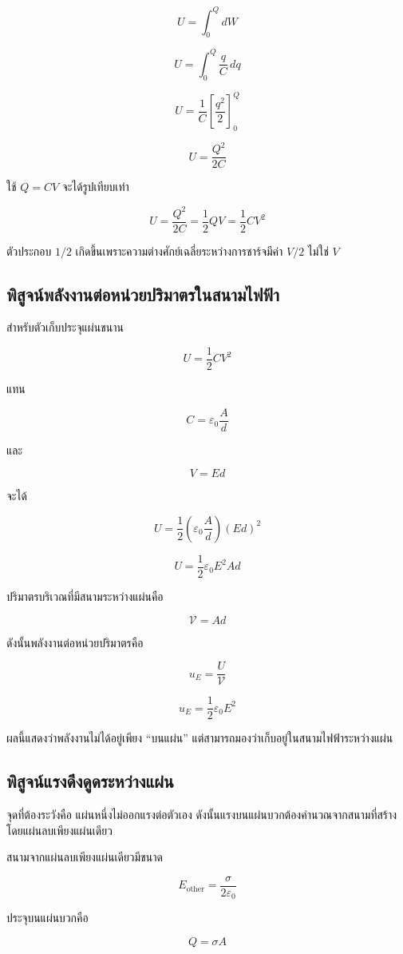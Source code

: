 \[
U=\int_0^Q dW
\]

\[
U=\int_0^Q \frac{q}{C}\,dq
\]

\[
U=\frac{1}{C}\left[\frac{q^2}{2}\right]_0^Q
\]

\[
U=\frac{Q^2}{2C}
\]

ใช้ $Q=CV$ จะได้รูปเทียบเท่า

\[
\boxed{
U=\frac{Q^2}{2C}
=\frac{1}{2}QV
=\frac{1}{2}CV^2}
\]

ตัวประกอบ $1/2$ เกิดขึ้นเพราะความต่างศักย์เฉลี่ยระหว่างการชาร์จมีค่า $V/2$ ไม่ใช่ $V$

\subsection{พิสูจน์พลังงานต่อหน่วยปริมาตรในสนามไฟฟ้า}

สำหรับตัวเก็บประจุแผ่นขนาน

\[
U=\frac{1}{2}CV^2
\]

แทน

\[
C=\varepsilon_0\frac{A}{d}
\]

และ

\[
V=Ed
\]

จะได้

\[
U
=
\frac{1}{2}
\left(\varepsilon_0\frac{A}{d}\right)
(Ed)^2
\]

\[
U=\frac{1}{2}\varepsilon_0E^2Ad
\]

ปริมาตรบริเวณที่มีสนามระหว่างแผ่นคือ

\[
\mathcal{V}=Ad
\]

ดังนั้นพลังงานต่อหน่วยปริมาตรคือ

\[
u_E=\frac{U}{\mathcal{V}}
\]

\[
\boxed{u_E=\frac{1}{2}\varepsilon_0E^2}
\]

ผลนี้แสดงว่าพลังงานไม่ได้อยู่เพียง ``บนแผ่น'' แต่สามารถมองว่าเก็บอยู่ในสนามไฟฟ้าระหว่างแผ่น

\subsection{พิสูจน์แรงดึงดูดระหว่างแผ่น}

จุดที่ต้องระวังคือ แผ่นหนึ่งไม่ออกแรงต่อตัวเอง ดังนั้นแรงบนแผ่นบวกต้องคำนวณจากสนามที่สร้างโดยแผ่นลบเพียงแผ่นเดียว

สนามจากแผ่นลบเพียงแผ่นเดียวมีขนาด

\[
E_{\text{other}}=\frac{\sigma}{2\varepsilon_0}
\]

ประจุบนแผ่นบวกคือ

\[
Q=\sigma A
\]

